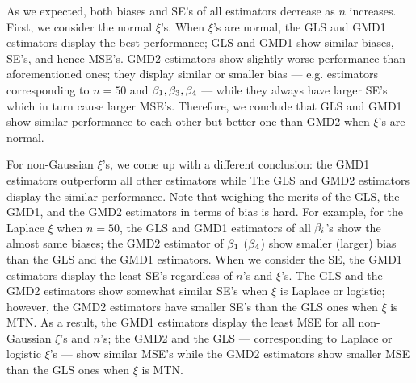 As we expected, both biases and SE's of all estimators decrease as $n$ increases. First, we consider the normal $\xi$'s. When $\xi$'s are normal, the GLS and GMD1 estimators display the best performance; GLS and GMD1 show similar biases, SE's, and hence MSE's. GMD2 estimators show slightly worse performance than aforementioned ones; they display similar or smaller bias --- e.g. estimators corresponding to $n=50$ and $\beta_{1}, \beta_{3},\beta_{4}$ --- while they always have larger SE's which in turn cause larger MSE's. Therefore, we conclude that GLS and GMD1 show similar performance to each other but better one than GMD2   when $\xi$'s are normal.

For non-Gaussian $\xi$'s, we come up with a different conclusion: the GMD1 estimators outperform all other estimators while The GLS and GMD2 estimators display the similar performance. Note that weighing the merits of the GLS, the GMD1, and the GMD2 estimators in terms of bias is hard. For example, for the Laplace $\xi$ when $n=50$, the GLS and GMD1 estimators of all $\beta_{i}$'s show the almost same biases; the GMD2 estimator of $\beta_{1}$ ($\beta_{4}$) show smaller (larger) bias than the GLS and the GMD1 estimators. When we consider the SE, the GMD1 estimators display the least SE's regardless of $n$'s and $\xi$'s. The GLS and the GMD2 estimators show somewhat similar SE's when $\xi$ is Laplace or logistic; however, the GMD2 estimators have smaller SE's than the GLS ones when $\xi$ is MTN. As a result, the GMD1 estimators display the least MSE for all non-Gaussian $\xi$'s and $n$'s; the GMD2 and the GLS --- corresponding to Laplace or logistic $\xi$'s --- show similar MSE's while the GMD2 estimators show smaller MSE than the GLS ones when $\xi$ is MTN.




\appendix
\setcounter{section}{1}
